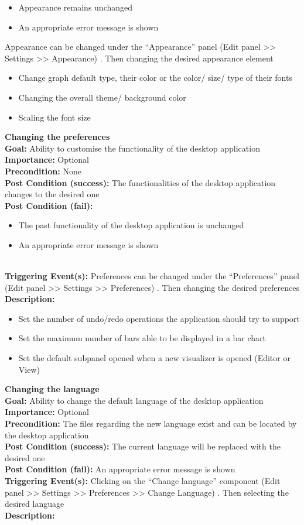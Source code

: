 \documentclass[10pt,a4paper]{report}
\newcommand{\precondition}[1]{
    \textbf{Precondition: } #1 \leavevmode \\
}
\newcommand{\FRODescription}[8]{
    \textbf{#1} \leavevmode \\
    \textbf{Goal: } #2 \leavevmode \\
    \textbf{Importance: } #3 \leavevmode \\
    \precondition{#4}
    \textbf{Post Condition (success): } #5 \leavevmode \\
    \textbf{Post Condition (fail): } #6 \leavevmode \\
    \textbf{Triggering Event(s): } #7 \leavevmode \\
    \textbf{Description: } \leavevmode \\
    #8}
\begin{document}
\begin{FRO}
    {\begin{itemize}
        \item Appearance remains unchanged
        \item An appropriate error message is shown
    \end{itemize}}
    {Appearance can be changed under the “Appearance” panel (Edit panel >> Settings >> Appearance) . Then changing the desired appearance element}
    {\begin{itemize}
        \item Change graph default type, their color or the color/ size/ type of their fonts
        \item Changing the overall theme/ background color
        \item Scaling the font size
    \end{itemize}}
    \item \FRODescription{Changing the preferences}
    {Ability to customise the functionality of the desktop application}
    {Optional}
    {None}
    {The functionalities of the desktop application changes to the desired one}
    {\begin{itemize}
        \item The past functionality of the desktop application is unchanged
        \item An appropriate error message is shown
    \end{itemize}}
    {Preferences can be changed under the “Preferences” panel (Edit panel >> Settings >> Preferences) . Then changing the desired preferences}
    {\begin{itemize}
        \item Set the number of undo/redo operations the application should try to support
        \item Set the maximum number of bars able to be displayed in a bar chart
        \item Set the default subpanel opened when a new visualizer is opened (Editor or View)
    \end{itemize}}
    \item \FRODescription{Changing the language}
    {Ability to change the default language of the desktop application}
    {Optional}
    {The files regarding the new language exist and can be located by the desktop application}
    {The current language will be replaced with the desired one}
    {An appropriate error message is shown}
    {Clicking on the “Change language” component (Edit panel >> Settings >> Preferences >> Change Language) . Then selecting the desired language}

\end{FRO}
\end{document}
